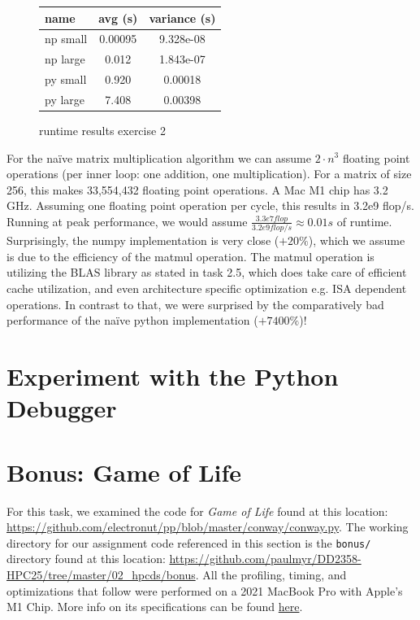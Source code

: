 \documentclass[a4paper,12pt]{article}
\begin{document}
\begin{figure}[H]
  \centering
  \begin{tabular}{l|c|c}
    name & avg (s) & variance (s)\\\hline
    np small & 0.00095 & 9.328e-08\\
    np large & 0.012 & 1.843e-07\\
    py small & 0.920 & 0.00018\\
    py large & 7.408 & 0.00398\\
  \end{tabular}
  \caption{runtime results exercise 2}\label{tab:ex2}
\end{figure}

For the naïve matrix multiplication algorithm we can assume $2 \cdot n^{3}$ floating point operations (per inner loop: one addition, one multiplication).
For a matrix of size 256, this makes 33,554,432 floating point operations.
A Mac M1 chip has 3.2 GHz.
Assuming one floating point operation per cycle, this results in 3.2e9 flop/s.
Running at peak performance, we would assume
$\frac{3.3e7 flop}{3.2e9flop/s} \approx 0.01s$ of runtime.
Surprisingly, the numpy implementation is very close ($+20\%$), which we assume is due to the efficiency of the matmul operation. The matmul operation is utilizing the BLAS library as stated in task 2.5, which
 does take care of efficient cache utilization, and even architecture specific optimization e.g. ISA dependent operations. In contrast to that, we were surprised by the comparatively bad performance of the naïve python implementation ($+7400\%$)!

\section{Experiment with the Python Debugger}
\section{Bonus: Game of Life}
For this task, we examined the code for \textit{Game of Life} found at this location: \url{https://github.com/electronut/pp/blob/master/conway/conway.py}. The working directory for our assignment code referenced in this section is the \verb|bonus/| directory found at this location: \url{https://github.com/paulmyr/DD2358-HPC25/tree/master/02_hpcds/bonus}. All the profiling, timing, and optimizations that follow were performed on a 2021 MacBook Pro with Apple's M1 Chip. More info on its specifications can be found \href{https://support.apple.com/en-us/111901}{here}.
\end{document}
